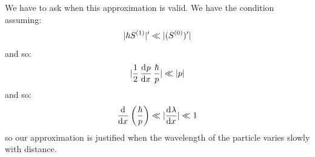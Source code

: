 We have to ask when this approximation is valid. We have the condition assuming:
\begin{equation}
    \lvert \hbar S^{(1)} \rvert' \ll \lvert (S^{(0)})' \rvert
\end{equation}
and so:
\begin{equation}
    \abs{\frac{1}{2}\dod{p}{x}\frac{\hbar}{p}} \ll \abs{p}
\end{equation}
and so:
\begin{equation}
    \dod{}{x}\left(\frac{\hbar}{p}\right) \ll \abs{\dod{\lambda}{x}} \ll 1
\end{equation}
so our approximation is justified when the wavelength of the particle varies slowly with distance.
